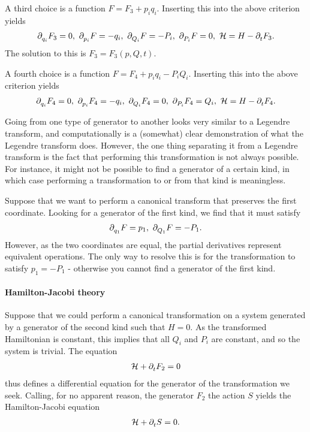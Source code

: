 A third choice is a function $F = F_{3} + p_{i}q_{i}$. Inserting this into the above criterion yields
\begin{align*}
	\partial^{}_{q_{i}}F_{3} = 0,\ \partial^{}_{p_{i}}F = -q_{i},\ \partial^{}_{Q_{i}}F = -P_{i},\ \partial^{}_{P_{i}}F = 0,\ \mathcal{H} = H - \partial^{}_{t}F_{3}.
\end{align*}
The solution to this is $F_{3} = F_{3}(p, Q, t)$.

A fourth choice is a function $F = F_{4} + p_{i}q_{i} - P_{i}Q_{i}$. Inserting this into the above criterion yields
\begin{align*}
	\del{q_{i}}{F_{4}} = 0,\ \del{p_{i}}{F_{4}} = -q_{i},\ \del{Q_{i}}{F_{4}} = 0,\ \del{P_{i}}{F_{4}} = Q_{i},\ \ham = H - \del{t}{F_{4}}.
\end{align*}

Going from one type of generator to another looks very similar to a Legendre transform, and computationally is a (somewhat) clear demonstration of what the Legendre transform does. However, the one thing separating it from a Legendre transform is the fact that performing this transformation is not always possible. For instance, it might not be possible to find a generator of a certain kind, in which case performing a transformation to or from that kind is meaningless.

Suppose that we want to perform a canonical transform that preserves the first coordinate. Looking for a generator of the first kind, we find that it must satisfy
\begin{align*}
	\partial^{}_{q_{1}}F = p_{1},\ \partial^{}_{Q_{1}}F = -P_{1}.
\end{align*}
However, as the two coordinates are equal, the partial derivatives represent equivalent operations. The only way to resolve this is for the transformation to satisfy $p_{1} = -P_{1}$ - otherwise you cannot find a generator of the first kind.

\paragraph{Hamilton-Jacobi theory}
Suppose that we could perform a canonical transformation on a system generated by a generator of the second kind such that $H = 0$. As the transformed Hamiltonian is constant, this implies that all $Q_{i}$ and $P_{i}$ are constant, and so the system is trivial. The equation
\begin{align*}
	\mathcal{H} + \partial^{}_{t}F_{2} = 0
\end{align*}
thus defines a differential equation for the generator of the transformation we seek. Calling, for no apparent reason, the generator $F_{2}$ the action $S$ yields the Hamilton-Jacobi equation
\begin{align*}
	\mathcal{H} + \partial^{}_{t}S = 0.
\end{align*}

